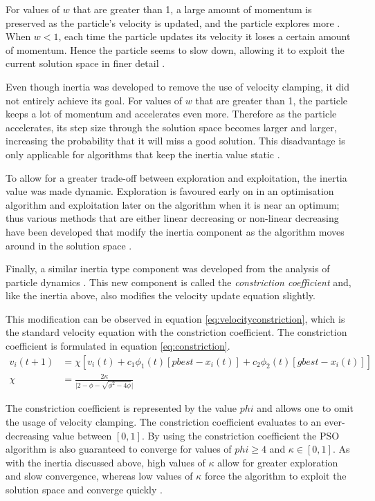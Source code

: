 For values of $w$ that are greater than 1, a large amount of momentum is preserved as the particle's velocity is updated, and the particle explores more \cite{FundamentalSwarm}. When $w < 1$, each time the particle updates its velocity it loses a certain amount of momentum. Hence the particle seems to slow down, allowing it to exploit the current solution space in finer detail \cite{FundamentalSwarm}.

Even though inertia was developed to remove the use of velocity clamping, it did not entirely achieve its goal. For values of $w$ that are greater than 1, the particle keeps a lot of momentum and accelerates even more. Therefore as the particle accelerates, its step size through the solution space becomes larger and larger, increasing the probability that it will miss a good solution. This disadvantage is only applicable for algorithms that keep the inertia value static \cite{CompuIntelligenceIntro,FundamentalSwarm}.

To allow for a greater trade-off between exploration and exploitation, the inertia value was made dynamic. Exploration is favoured early on in an optimisation algorithm and  exploitation later on the algorithm when it is near an optimum; thus various methods that are either linear decreasing or non-linear decreasing have been developed that modify the inertia component as the algorithm moves around in the solution space \cite{CompuIntelligenceIntro,FundamentalSwarm}.

Finally, a similar inertia type component was developed from the analysis of particle dynamics \cite{FundamentalSwarm}. This new component is called the \emph{constriction coefficient} and, like the inertia above, also modifies the velocity update equation slightly\cite{adaptPSO,FundamentalSwarm,CompuIntelligenceIntro}. 

This modification can be observed in equation \ref{eq:velocityconstriction}, which is the standard velocity equation with the constriction coefficient. The constriction coefficient is formulated in equation \ref{eq:constriction}\cite{adaptPSO,FundamentalSwarm,CompuIntelligenceIntro}.
\begin{align}
v_i(t+1) &= \chi[v_i(t) + c_1\phi_{1}(t)[pbest - x_i(t)] + c_2\phi_{2}(t)[gbest - x_i(t)]]\label{eq:velocityconstriction}\\
\chi &= \frac{2\kappa}{\lvert 2 - \phi - \sqrt{\phi^2 - 4\phi}\rvert}\label{eq:constriction}
\end{align}

The constriction coefficient is represented by the value $phi$ and allows one to omit the usage of velocity clamping. The constriction coefficient evaluates to an ever-decreasing value between $[0,1]$. By using the constriction coefficient the PSO algorithm is also guaranteed to converge for values of $phi \geq 4$ and $\kappa \in [0,1]$. As with the inertia discussed above, high values of $\kappa$ allow for greater exploration and slow convergence, whereas low values of $\kappa$ force the algorithm to exploit the solution space and converge quickly \cite{adaptPSO,FundamentalSwarm,CompuIntelligenceIntro}.

